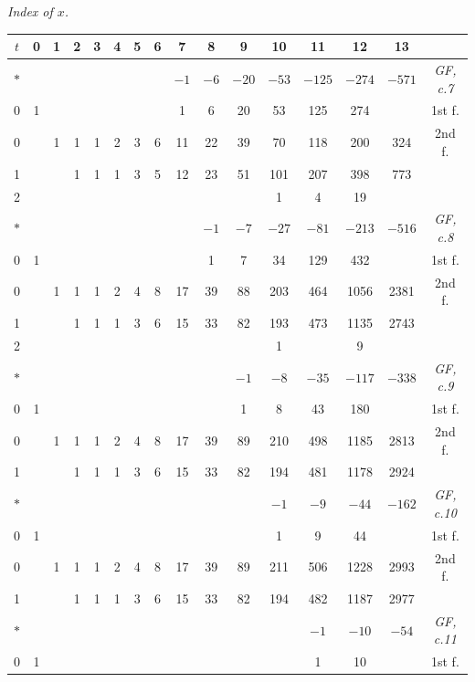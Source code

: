 \documentclass[11pt,a4paper]{book}
\begin{document}
\begin{small}
\begin{center}
\textit{Index of $x$.}
\end{center}
\begin{longtable}{|c|cccccccccccccc|c|}
\hline
$t$ & 0 & 1 & 2 & 3 & 4 & 5 & 6 & 7 & 8 & 9 & 10 & 11 & 12 & 13 & \\
\hline
\endhead
$*$ & & & & & & & & $-1$ & $-6$ & $-20$ & $-53$ & $-125$ & $-274$ & $-571$ & \textit{GF, c.7} \\
\hline
0 & 1 & & & & & & & 1 & 6 & 20 & 53 & 125 & 274 & & 1st f. \\
\hline
0 & & 1 & 1 & 1 & 2 & 3 & 6 & 11 & 22 & 39 & 70 & 118 & 200 & 324 & 2nd f. \\
1 & & & 1 & 1 & 1 & 3 & 5 & 12 & 23 & 51 & 101 & 207 & 398 & 773 \\
2 & & & & & & & & & & & 1 & 4 & 19 &  \\
\hline
$*$ & & & & & & & & & $-1$ & $-7$ & $-27$ & $-81$ & $-213$ & $-516$ & \textit{GF, c.8} \\
\hline
0 & 1 & & & & & & & & 1 & 7 & 34 & 129 & 432 & & 1st f. \\
\hline
0 & & 1 & 1 & 1 & 2 & 4 & 8 & 17 & 39 & 88 & 203 & 464 & 1056 & 2381 & 2nd f. \\
1 & & & 1 & 1 & 1 & 3 & 6 & 15 & 33 & 82 & 193 & 473 & 1135 & 2743 \\
2 & & & & & & & & & & & 1 & & 9 &  \\
\hline
$*$ & & & & & & & & & & $-1$ & $-8$ & $-35$ & $-117$ & $-338$ & \textit{GF, c.9} \\
\hline
0 & 1 & & & & & & & & & 1 & 8 & 43 & 180 & & 1st f. \\
\hline
0 & & 1 & 1 & 1 & 2 & 4 & 8 & 17 & 39 & 89 & 210 & 498 & 1185 & 2813 & 2nd f. \\
1 & & & 1 & 1 & 1 & 3 & 6 & 15 & 33 & 82 & 194 & 481 & 1178 & 2924 \\
\hline
$*$ & & & & & & & & & & & $-1$ & $-9$ & $-44$ & $-162$ & \textit{GF, c.10} \\
\hline
0 & 1 & & & & & & & & & & 1 & 9 & 44 & & 1st f. \\
\hline
0 & & 1 & 1 & 1 & 2 & 4 & 8 & 17 & 39 & 89 & 211 & 506 & 1228 & 2993 & 2nd f. \\
1 & & & 1 & 1 & 1 & 3 & 6 & 15 & 33 & 82 & 194 & 482 & 1187 & 2977 \\
\hline
$*$ & & & & & & & & & & & & $-1$ & $-10$ & $-54$ & \textit{GF, c.11} \\
\hline
0 & 1 & & & & & & & & & & & 1 & 10 & & 1st f. \\

\end{longtable}
\end{small}
\end{document}
